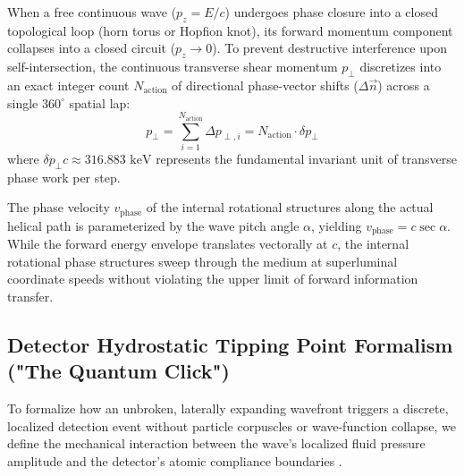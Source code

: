 \documentclass[11pt,a4paper]{article}
\begin{document}
	When a free continuous wave ($p_z = E/c$) undergoes phase closure into a closed topological loop (horn torus or Hopfion knot), its forward momentum component collapses into a closed circuit ($p_z \to 0$). To prevent destructive interference upon self-intersection, the continuous transverse shear momentum $p_\perp$ discretizes into an exact integer count $N_{\text{action}}$ of directional phase-vector shifts ($\Delta\vec{n}$) across a single $360^\circ$ spatial lap:
	\begin{equation}
		p_\perp = \sum_{i=1}^{N_{\text{action}}} \Delta p_{\perp, i} = N_{\text{action}} \cdot \delta p_\perp
	\end{equation}
	where $\delta p_\perp c \approx 316.883\text{ keV}$ represents the fundamental invariant unit of transverse phase work per step.
	
	The phase velocity $v_{\text{phase}}$ of the internal rotational structures along the actual helical path is parameterized by the wave pitch angle $\alpha$, yielding $v_{\text{phase}} = c \sec \alpha$. While the forward energy envelope translates vectorally at $c$, the internal rotational phase structures sweep through the medium at superluminal coordinate speeds without violating the upper limit of forward information transfer.
	
	\subsection{Detector Hydrostatic Tipping Point Formalism ("The Quantum Click")}
	To formalize how an unbroken, laterally expanding wavefront triggers a discrete, localized detection event without particle corpuscles or wave-function collapse, we define the mechanical interaction between the wave's localized fluid pressure amplitude and the detector's atomic compliance boundaries \cite{kulangiev2025}.
	
\end{document}
